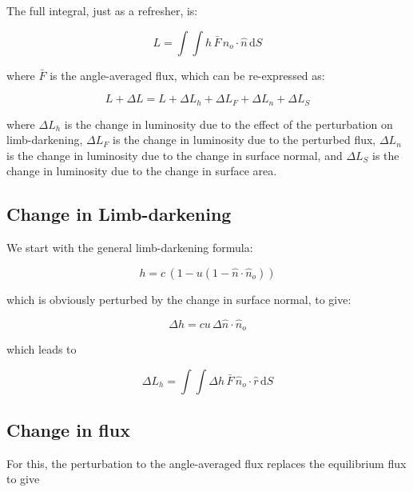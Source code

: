 \documentclass[11pt]{amsart}
\begin{document}
The full integral, just as a refresher, is:

\begin{equation}
L = \int \int h \, \bar{F} \, \hat{n}_{o} \! \cdot \! \hat{n} \, \text{d}S
\end{equation}

where $\bar{F}$ is the angle-averaged flux, which can be re-expressed as:

\begin{equation}
L + \Delta L = L + \Delta L_{h} + \Delta L_{F} + \Delta L_{n} + \Delta L_{S}
\end{equation}

where $\Delta L_{h}$ is the change in luminosity due to the effect of the perturbation on limb-darkening, $\Delta L_{F}$ is the change in luminosity due to the perturbed flux, $\Delta L_{n}$ is the change in luminosity due to the change in surface normal, and $\Delta L_{S}$ is the change in luminosity due to the change in surface area.

\subsection{Change in Limb-darkening} \label{Lum:LD}

We start with the general limb-darkening formula:

\begin{equation}
h = c \, ( 1 - u (1 - \hat{n} \! \cdot \! \hat{n}_{o}) )
\end{equation}

which is obviously perturbed by the change in surface normal, to give:

\begin{equation}
\Delta h = c u \, \Delta \hat{n} \! \cdot \! \hat{n}_{o}
\end{equation}

which leads to

\begin{equation}
\Delta L_{h} = \int \int \Delta h \, \bar{F} \, \hat{n}_{o} \! \cdot \! \hat{r} \, \text{d}S
\end{equation}



\subsection{Change in flux} \label{Lum:F}

For this, the perturbation to the angle-averaged flux replaces the equilibrium flux to give
\end{document}
